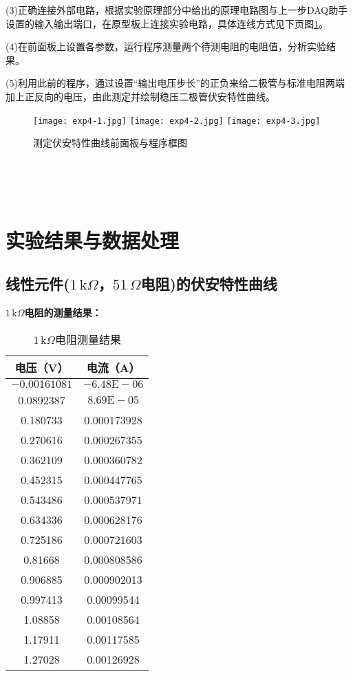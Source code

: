 \documentclass[UTF-8,twoside,cs4size]{ctexart}
\begin{document}
	(3)正确连接外部电路，根据实验原理部分中给出的原理电路图与上一步DAQ助手设置的输入输出端口，在原型板上连接实验电路，具体连线方式见下页图\ref{fig5}。
	
	(4)在前面板上设置各参数，运行程序测量两个待测电阻的电阻值，分析实验结果。
	
	(5)利用此前的程序，通过设置“输出电压步长”的正负来给二极管与标准电阻两端加上正反向的电压，由此测定并绘制稳压二极管伏安特性曲线。
	
	\begin{figure}[p]
		\centering
		\texttt{[image: exp4-1.jpg]}
		\texttt{[image: exp4-2.jpg]}
		\texttt{[image: exp4-3.jpg]}
		\caption{\small 测定伏安特性曲线前面板与程序框图}
		\label{fig5}
	\end{figure}

	~\\
	
	~\\
	
	~\\
	
	\section{实验结果与数据处理}
	\subsection{线性元件($ 1\,\mathrm k\Omega $，$ 51\,\Omega $电阻)的伏安特性曲线}
	\textbf{$ 1\,\mathrm k\Omega $电阻的测量结果：}
	\begin{table}[h]
		\centering
		\begin{tabular}{|c|c|}
			\hline
			电压（V） & 电流（A）\\
			\hline
			$ -0.00161081 $ & $ -6.48\mathrm E-06 $\\
			\hline
			0.0892387 & $ 8.69\mathrm E-05 $\\
			\hline
			0.180733 & 0.000173928\\
			\hline
			0.270616 & 0.000267355\\
			\hline
			0.362109 & 0.000360782\\
			\hline
			0.452315 & 0.000447765\\
			\hline
			0.543486 & 0.000537971\\
			\hline
			0.634336 & 0.000628176\\
			\hline
			0.725186 & 0.000721603\\
			\hline
			0.81668 & 0.000808586\\
			\hline
			0.906885 & 0.000902013\\
			\hline
			0.997413 & 0.00099544\\
			\hline
			1.08858 & 0.00108564\\
			\hline
			1.17911 & 0.00117585\\
			\hline
			1.27028 & 0.00126928\\
			\hline
		\end{tabular}
		\caption{\small $ 1\,\mathrm k\Omega $电阻测量结果}
	\end{table}
\end{document}
